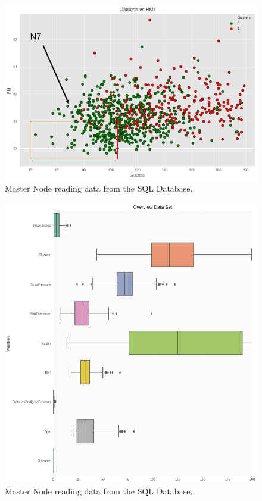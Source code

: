 \documentclass[12pt]{article}
\begin{document}
\begin{figure}[ht]
\centering
\includegraphics[width=1\textwidth]{download(5).png}
\caption{Master Node reading data from the SQL Database.}
\end{figure}

\begin{figure}[ht]
\centering
\includegraphics[width=1\textwidth]{download.png}
\caption{Master Node reading data from the SQL Database.}
\end{figure}
\end{document}
